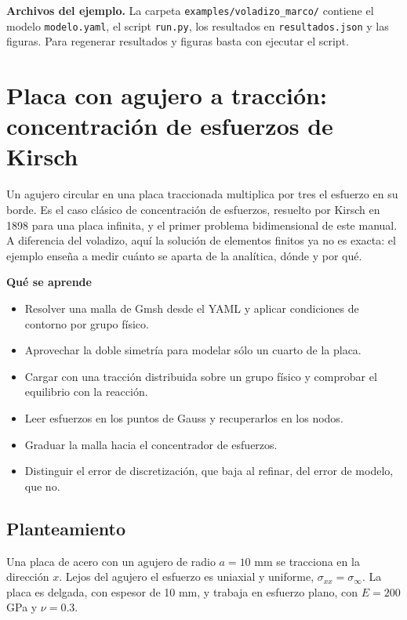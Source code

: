 \documentclass[11pt,oneside]{report}
\renewcommand{\chaptermark}[1]{\markboth{Cap.\ \thechapter\ ---\ #1}{}}
\begin{document}
\textbf{Archivos del ejemplo.} La carpeta \texttt{examples/\allowbreak{}voladizo\_\allowbreak{}marco/\allowbreak{}} contiene el modelo \texttt{modelo.yaml}, el script \texttt{run.py}, los resultados en \texttt{resultados.json} y las figuras. Para regenerar resultados y figuras basta con ejecutar el script.


\newpage

\chapter{Placa con agujero a tracción: concentración de esfuerzos de Kirsch}
\chaptermark{Placa con agujero a tracción}
\label{cap:placa_agujero_kirsch}





Un agujero circular en una placa traccionada multiplica por tres el esfuerzo en su borde. Es el caso clásico de concentración de esfuerzos, resuelto por Kirsch en 1898 para una placa infinita, y el primer problema bidimensional de este manual. A diferencia del voladizo, aquí la solución de elementos finitos ya no es exacta: el ejemplo enseña a medir cuánto se aparta de la analítica, dónde y por qué.

\textbf{Qué se aprende}

\begin{itemize}
  \item Resolver una malla de Gmsh desde el YAML y aplicar condiciones de contorno por grupo físico.
  \item Aprovechar la doble simetría para modelar sólo un cuarto de la placa.
  \item Cargar con una tracción distribuida sobre un grupo físico y comprobar el equilibrio con la reacción.
  \item Leer esfuerzos en los puntos de Gauss y recuperarlos en los nodos.
  \item Graduar la malla hacia el concentrador de esfuerzos.
  \item Distinguir el error de discretización, que baja al refinar, del error de modelo, que no.
\end{itemize}

\section{Planteamiento}

Una placa de acero con un agujero de radio $a = 10$ mm se tracciona en la dirección $x$. Lejos del agujero el esfuerzo es uniaxial y uniforme, $\sigma_{xx} = \sigma_\infty$. La placa es delgada, con espesor de 10 mm, y trabaja en esfuerzo plano, con $E = 200$ GPa y $\nu = 0.3$.
\end{document}
